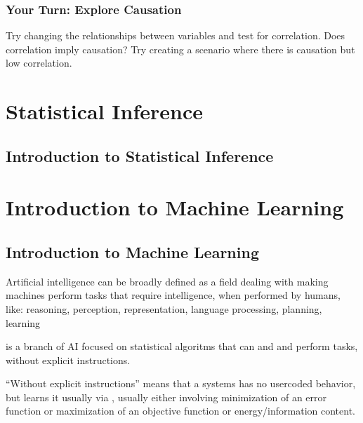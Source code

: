 \documentclass[letterpaper,10pt,english]{jupyterBook}
\begin{document}
\section{Your Turn: Explore Causation}
\label{\detokenize{code/notebooks/correlation_vs_causation:your-turn-explore-causation}}
\sphinxAtStartPar
Try changing the relationships between variables and test for correlation. Does correlation imply causation? Try creating a scenario where there is causation but low correlation.

\sphinxstepscope


\part{Statistical Inference}

\sphinxstepscope


\chapter{Introduction to Statistical Inference}
\label{\detokenize{ch/infer/intro:introduction-to-statistical-inference}}\label{\detokenize{ch/infer/intro:infer-intro}}\label{\detokenize{ch/infer/intro::doc}}
\sphinxstepscope


\part{Introduction to Machine Learning}

\sphinxstepscope


\chapter{Introduction to Machine Learning}
\label{\detokenize{ch/ml/intro:introduction-to-machine-learning}}\label{\detokenize{ch/ml/intro:ml-intro}}\label{\detokenize{ch/ml/intro::doc}}
\sphinxAtStartPar
Artificial intelligence can be broadly defined as a field dealing with making machines perform tasks that require intelligence, when performed by humans, like: reasoning, perception, representation, language processing, planning, learning

\sphinxAtStartPar
{} is a branch of AI focused on statistical algoritms that can  and  and perform tasks, without explicit instructions.%
\begin{footnote}[1]\sphinxAtStartFootnote
“Without explicit instructions” means that a systems has no user\sphinxhyphen{}coded behavior, but learns it usually via , usually either involving minimization of an error function or maximization of an objective function or energy/information content.
%
\end{footnote}
\end{document}
